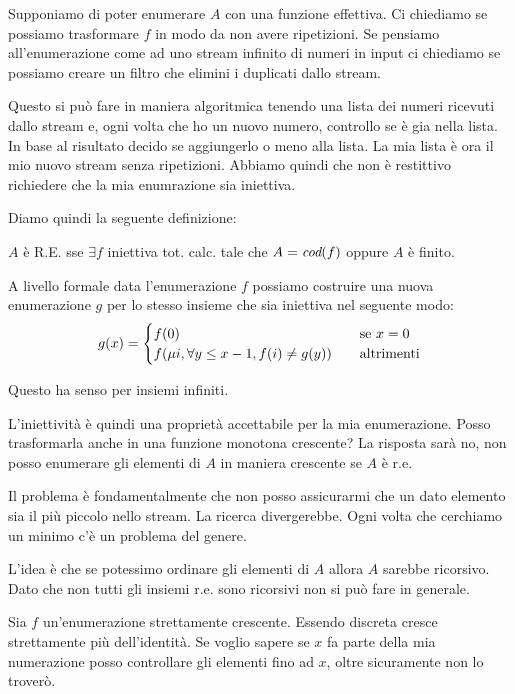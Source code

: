 Supponiamo di poter enumerare $A$ con una funzione effettiva. Ci chiediamo se possiamo trasformare
$f$ in modo da non avere ripetizioni. Se pensiamo all'enumerazione come ad uno stream infinito di
numeri in input ci chiediamo se possiamo creare un filtro che elimini i duplicati dallo stream.

Questo si può fare in maniera algoritmica tenendo una lista dei numeri ricevuti dallo stream e, ogni
volta che ho un nuovo numero, controllo se è gia nella lista. In base al risultato decido se
aggiungerlo o meno alla lista. La mia lista è ora il mio nuovo stream senza ripetizioni. Abbiamo
quindi che non è restittivo richiedere che la mia enumrazione sia iniettiva.

Diamo quindi la seguente definizione:

\begin{defn}
    $A$ è R.E. sse $\exists f$ iniettiva tot. calc. tale che $A = \textit{cod}(f)$ oppure $A$ è finito.
\end{defn}

A livello formale data l'enumerazione $f$ possiamo costruire una nuova enumerazione $g$ per lo
stesso insieme che sia iniettiva nel seguente modo:
\begin{equation*}
    g(x) =
    \begin{cases}
        f(0) \quad &\text{se $x = 0$} \\
        f(\mu i, \forall y \leq x-1, f(i) \not= g(y)) \quad &\text{altrimenti}
    \end{cases}
\end{equation*}

Questo ha senso per insiemi infiniti.

L'iniettività è quindi una proprietà accettabile per la mia enumerazione. Posso trasformarla anche
in una funzione monotona crescente? La risposta sarà no, non posso enumerare gli elementi di $A$ in
maniera crescente se $A$ è r.e.

Il problema è fondamentalmente che non posso assicurarmi che un dato elemento sia il più piccolo
nello stream. La ricerca divergerebbe. Ogni volta che cerchiamo un minimo c'è un problema del
genere.

L'idea è che se potessimo ordinare gli elementi di $A$ allora $A$ sarebbe ricorsivo. Dato che non tutti
gli insiemi r.e. sono ricorsivi non si può fare in generale.

Sia $f$ un'enumerazione strettamente crescente. Essendo discreta cresce strettamente più
dell'identità. Se voglio sapere se $x$ fa parte della mia numerazione posso controllare gli elementi
fino ad $x$, oltre sicuramente non lo troverò.

